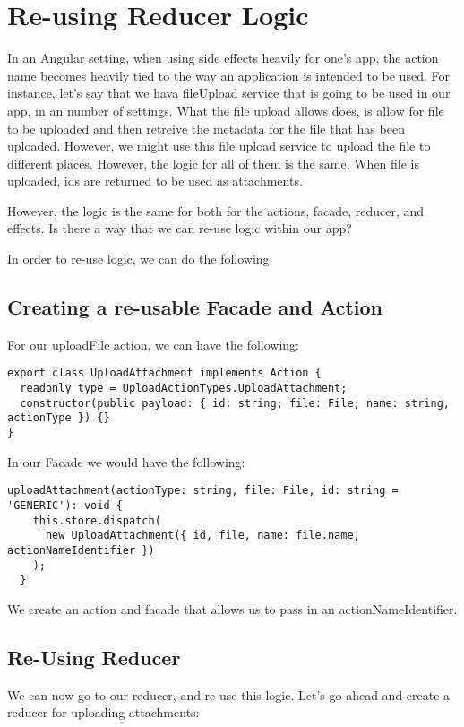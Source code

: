 \maketitle{}
\section{ Re-using Reducer Logic }

In an Angular setting, when using side effects heavily for one's app, the action
name becomes heavily tied to the way an application is intended to be used. For
instance, let's say that we hava fileUpload service that is going to be used in
our app, in an number of settings. What the file upload allows does, is allow
for file to be uploaded and then retreive the metadata for the file that has
been uploaded. However, we might use this file upload service to upload the
file to different places. However, the logic for all of them is the same. When
file is uploaded, ids are returned to be used as attachments.

However, the logic is the same for both for the actions, facade, reducer, and
effects. Is there a way that we can re-use logic within our app?

In order to re-use logic, we can do the following.

\subsection{Creating a re-usable Facade and Action}
For our uploadFile action, we can have the following:
\begin{lstlisting}
export class UploadAttachment implements Action {
  readonly type = UploadActionTypes.UploadAttachment;
  constructor(public payload: { id: string; file: File; name: string, actionType }) {}
}
\end{lstlisting}

In our Facade we would have the following:

\begin{lstlisting}
uploadAttachment(actionType: string, file: File, id: string = 'GENERIC'): void {
    this.store.dispatch(
      new UploadAttachment({ id, file, name: file.name, actionNameIdentifier })
    );
  }
\end{lstlisting}

We create an action and facade that allows us to pass in an
actionNameIdentifier.

\subsection{Re-Using Reducer}
We can now go to our reducer, and re-use this logic. Let's
go ahead and create a reducer for uploading attachments:

